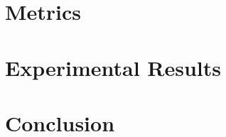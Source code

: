 \documentclass[12pt]{article}
\begin{document}
\section*{Metrics}
\section*{Experimental Results}
\section*{Conclusion}
\end{document}
